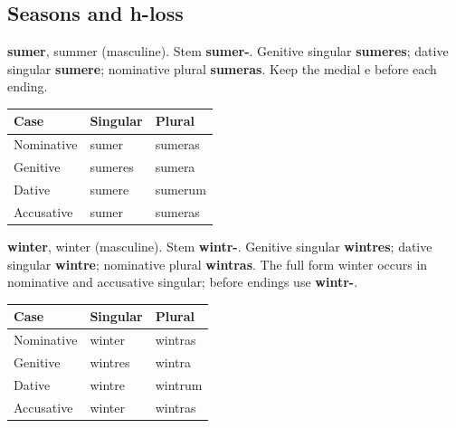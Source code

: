 \subsection*{Seasons and h-loss}

\textbf{sumer}, summer (masculine). Stem \textbf{sumer-}. Genitive singular \textbf{sumeres}; dative singular \textbf{sumere}; nominative plural \textbf{sumeras}. Keep the medial e before each ending.

\par\begingroup
\fontsize{10.5}{13.2}\selectfont
\setlength{\LTleft}{0pt}\setlength{\LTright}{\fill}
\noindent
\begin{tabular}{@{}>{\raggedright\arraybackslash}p{39.46mm}>{\raggedright\arraybackslash}p{39.46mm}>{\raggedright\arraybackslash}p{39.46mm}@{}}
\toprule
\textbf{Case} & \textbf{Singular} & \textbf{Plural} \\
\midrule
Nominative & sumer & sumeras \\
Genitive & sumeres & sumera \\
Dative & sumere & sumerum \\
Accusative & sumer & sumeras \\
\bottomrule
\end{tabular}
\par\endgroup

\textbf{winter}, winter (masculine). Stem \textbf{wintr-}. Genitive singular \textbf{wintres}; dative singular \textbf{wintre}; nominative plural \textbf{wintras}. The full form winter occurs in nominative and accusative singular; before endings use \textbf{wintr-}.

\par\begingroup
\fontsize{10.5}{13.2}\selectfont
\setlength{\LTleft}{0pt}\setlength{\LTright}{\fill}
\noindent
\begin{tabular}{@{}>{\raggedright\arraybackslash}p{39.46mm}>{\raggedright\arraybackslash}p{39.46mm}>{\raggedright\arraybackslash}p{39.46mm}@{}}
\toprule
\textbf{Case} & \textbf{Singular} & \textbf{Plural} \\
\midrule
Nominative & winter & wintras \\
Genitive & wintres & wintra \\
Dative & wintre & wintrum \\
Accusative & winter & wintras \\
\bottomrule
\end{tabular}
\par\endgroup

